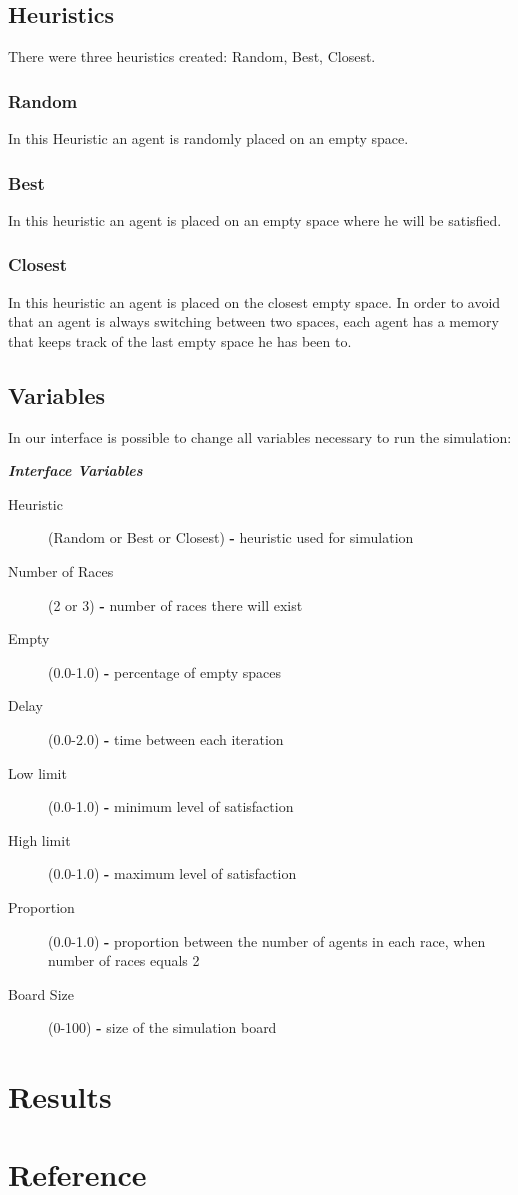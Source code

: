 \documentclass[a4paper,titlepage,11pt]{article}
\begin{document}
\subsection{Heuristics}
There were three heuristics created: Random, Best, Closest.

\subsubsection{Random}
In this Heuristic an agent is randomly placed on an empty space.

\subsubsection{Best}
In this heuristic an agent is placed on an empty space where he will be satisfied.

\subsubsection{Closest}
In this heuristic an agent is placed on the closest empty space. In order to avoid that an agent is always switching between two spaces, each agent has a memory that keeps track of the last empty space he has been to.

\subsection{Variables}
In our interface is possible to change all variables necessary to run the simulation:

\textit{ \textbf{Interface Variables} }
\begin{description}
\item [ Heuristic ] (Random or Best or Closest) \textbf{-} heuristic used for simulation
\item [ Number of Races ] (2 or 3) \textbf{-} number of races there will exist
\item [ Empty ] (0.0-1.0) \textbf{-} percentage of empty spaces
\item [ Delay ] (0.0-2.0) \textbf{-} time between each iteration
\item [ Low limit ] (0.0-1.0) \textbf{-} minimum level of satisfaction
\item [ High limit ] (0.0-1.0) \textbf{-} maximum level of satisfaction
\item [ Proportion ] (0.0-1.0) \textbf{-} proportion between the number of agents in each race, when number of races equals 2
\item [ Board Size ] (0-100) \textbf{-} size of the simulation board
\end{description}

\section{Results}

\section{Reference}
\end{document}
